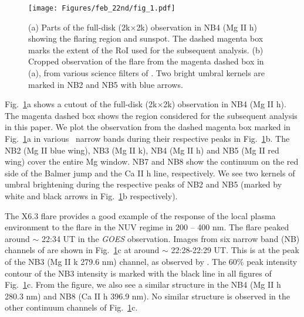 \begin{figure}
    \centering
    \texttt{[image: Figures/feb\_22nd/fig\_1.pdf]} 
    \caption[SUIT observation of the flare at the respective peak of all filters]{(a) Parts of the full-disk (2k$\times$2k) observation in NB4 (Mg II h) showing the flaring region and sunspot. The dashed magenta box marks the extent of the {\suit} RoI used for the subsequent analysis. {(b)} Cropped observation of the flare from the magenta dashed box in (a), from various science filters of \suit. Two bright umbral kernels are marked in NB2 and NB5 with blue arrows.}
    \label{fig:flare_obs}
\end{figure}

Fig.~\ref{fig:flare_obs}a shows a cutout of the full-disk (2k$\times$2k) observation in NB4 (Mg II h). The magenta dashed box shows the region considered for the subsequent analysis in this paper. We plot the observation from the dashed magenta box marked in Fig.~\ref{fig:flare_obs}a in various \suit~narrow bands during their respective peaks in Fig.~\ref{fig:flare_obs}b. The NB2 (Mg II blue wing), NB3 (Mg II k), NB4 (Mg II h) and NB5 (Mg II red wing) cover the entire Mg window. NB7 and NB8 show the continuum on the red side of the Balmer jump and the Ca II h line, respectively. We see two kernels of umbral brightening during the respective peaks of NB2 and NB5 (marked by white and black arrows in Fig.~\ref{fig:flare_obs}b respectively).

The X6.3 flare provides a good example of the response of the local plasma environment to the flare in the NUV regime in 200 {--} 400 nm. The flare peaked around $\sim$ 22:34 UT in the {\it GOES} observation. Images from six narrow band (NB) channels of {\suit} are shown in Fig.~\ref{fig:flare_obs}c at around $\sim$ 22:28-22:29 UT. This is at the peak of the NB3 (Mg II k 279.6 nm) channel, as observed by \suit. The 60\% peak intensity contour of the NB3 intensity is marked with the black line in all figures of Fig.~\ref{fig:flare_obs}c. From the figure, we also see a similar structure in the NB4 (Mg II h 280.3 nm) and NB8 (Ca II h 396.9 nm). No similar structure is observed in the other continuum channels of Fig.~\ref{fig:flare_obs}c.

